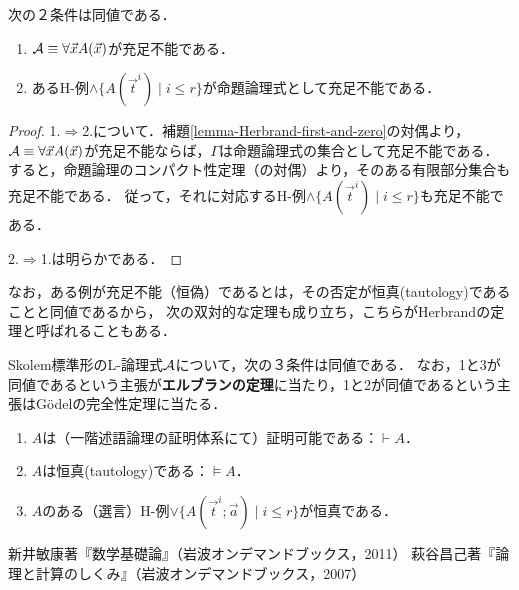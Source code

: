 \documentclass[uplatex,dvipdfmx]{jsarticle}
\begin{document}
\begin{theorem}
    次の２条件は同値である．
    \begin{enumerate}
        \item $\mathcal{A}\equiv\forall\vec{x}A(\vec{x})$が充足不能である．
        \item あるH-例$\land\{A(\vec{t}^i)\mid i\le r\}$が命題論理式として充足不能である．
    \end{enumerate}
\end{theorem}
\begin{proof}
    1.$\Rightarrow$2.について．補題\ref{lemma-Herbrand-first-and-zero}の対偶より，
    $\mathcal{A}\equiv\forall\vec{x}A(\vec{x})$が充足不能ならば，$\Gamma$は命題論理式の集合として充足不能である．
    すると，命題論理のコンパクト性定理（の対偶）より，そのある有限部分集合も充足不能である．
    従って，それに対応するH-例$\land\{A(\vec{t}^i)\mid i\le r\}$も充足不能である．

    2.$\Rightarrow$1.は明らかである．
\end{proof}

なお，ある例が充足不能（恒偽）であるとは，その否定が恒真(tautology)であることと同値であるから，
次の双対的な定理も成り立ち，こちらがHerbrandの定理と呼ばれることもある．

\begin{theorem}
    Skolem標準形のL-論理式$\mathcal{A}$について，次の３条件は同値である．
    なお，1と3が同値であるという主張が\textbf{エルブランの定理}に当たり，1と2が同値であるという主張はGödelの完全性定理に当たる．
    \begin{enumerate}
        \item $A$は（一階述語論理の証明体系にて）証明可能である：$\vdash A$．
        \item $A$は恒真(tautology)である：$\vDash A$．
        \item $A$のある（選言）H-例$\lor\{A(\vec{t}^i;\vec{a})\mid i\le r\}$が恒真である．
    \end{enumerate}
\end{theorem}





\begin{thebibliography}{9}
    新井敏康著『数学基礎論』（岩波オンデマンドブックス，2011）
    萩谷昌己著『論理と計算のしくみ』（岩波オンデマンドブックス，2007）
\end{thebibliography}
\end{document}
